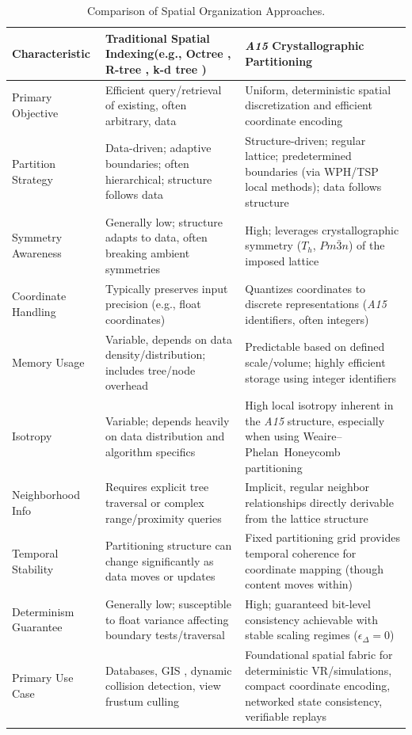 \documentclass[10pt]{article}
\def\AAAB{\textit{A15}}
\def\WP{Weaire--Phelan}
\def\WPH{\WP{}~Honeycomb}
\begin{document}
\begin{table}[!ht]
\centering
\caption{Comparison of Spatial Organization Approaches.}
\label{tab:comparison-indexing}
\begin{tabularx}{\textwidth}{>{\raggedright\arraybackslash}p{} >{\raggedright\arraybackslash}p{} >{\raggedright\arraybackslash}X}
\toprule
\textbf{Characteristic} & \textbf{Traditional Spatial Indexing}\newline (e.g., Octree \cite{Finkel1974}, R-tree \cite{Guttman1984}, k-d tree \cite{Bentley1975}) & \textbf{\AAAB{} Crystallographic Partitioning} \\
\midrule
Primary Objective & Efficient query/retrieval of existing, often arbitrary, data & Uniform, deterministic spatial discretization and efficient coordinate encoding \\ \addlinespace
Partition Strategy & Data-driven; adaptive boundaries; often hierarchical; structure follows data & Structure-driven; regular lattice; predetermined boundaries (via WPH/TSP local methods); data follows structure \\ \addlinespace
Symmetry Awareness & Generally low; structure adapts to data, often breaking ambient symmetries & High; leverages crystallographic symmetry ($T_h$, $Pm\bar{3}n$) of the imposed lattice \\ \addlinespace
Coordinate Handling & Typically preserves input precision (e.g., float coordinates) & Quantizes coordinates to discrete representations (\AAAB{} identifiers, often integers) \\ \addlinespace
Memory Usage & Variable, depends on data density/distribution; includes tree/node overhead & Predictable based on defined scale/volume; highly efficient storage using integer identifiers \\ \addlinespace
Isotropy & Variable; depends heavily on data distribution and algorithm specifics & High local isotropy inherent in the \AAAB{} structure, especially when using \WPH{} partitioning \\ \addlinespace
Neighborhood Info & Requires explicit tree traversal or complex range/proximity queries & Implicit, regular neighbor relationships directly derivable from the lattice structure \\ \addlinespace
Temporal Stability & Partitioning structure can change significantly as data moves or updates & Fixed partitioning grid provides temporal coherence for coordinate mapping (though content moves within) \\ \addlinespace
Determinism Guarantee & Generally low; susceptible to float variance affecting boundary tests/traversal & High; guaranteed bit-level consistency achievable with stable scaling regimes ($\epsilon_\Delta = 0$) \\ \addlinespace
Primary Use Case & Databases, GIS \cite{Samet1990}, dynamic collision detection, view frustum culling & Foundational spatial fabric for deterministic VR/simulations, compact coordinate encoding, networked state consistency, verifiable replays \\
\bottomrule
\end{tabularx}
\end{table}
\end{document}
